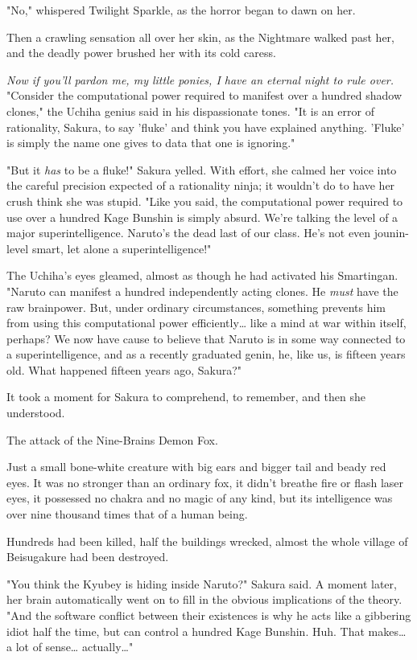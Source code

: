 "No," whispered Twilight Sparkle, as the horror began to dawn on her.

Then a crawling sensation all over her skin, as the Nightmare walked past her, 
and the deadly power brushed her with its cold caress.

\emph{Now if you'll pardon me, my little ponies, I have an eternal night to 
rule over.}
\sbreak
"Consider the computational power required to manifest over a hundred shadow 
clones," the Uchiha genius said in his dispassionate tones. "It is an error of 
rationality, Sakura, to say 'fluke' and think you have explained anything. 
'Fluke' is simply the name one gives to data that one is ignoring."

"But it \emph{has} to be a fluke!" Sakura yelled. With effort, she calmed her 
voice into the careful precision expected of a rationality ninja; it wouldn't 
do to have her crush think she was stupid. "Like you said, the computational 
power required to use over a hundred Kage Bunshin is simply absurd. We're 
talking the level of a major superintelligence. Naruto's the dead last of our 
class. He's not even jounin-level smart, let alone a superintelligence!"

The Uchiha's eyes gleamed, almost as though he had activated his Smartingan. 
"Naruto can manifest a hundred independently acting clones. He \emph{must} have 
the raw brainpower. But, under ordinary circumstances, something prevents him 
from using this computational power efficiently{\ldots} like a mind at war 
within itself, perhaps? We now have cause to believe that Naruto is in some way 
connected to a superintelligence, and as a recently graduated genin, he, like 
us, is fifteen years old. What happened fifteen years ago, Sakura?"

It took a moment for Sakura to comprehend, to remember, and then she understood.

The attack of the Nine-Brains Demon Fox.

Just a small bone-white creature with big ears and bigger tail and beady red 
eyes. It was no stronger than an ordinary fox, it didn't breathe fire or flash 
laser eyes, it possessed no chakra and no magic of any kind, but its 
intelligence was over nine thousand times that of a human being.

Hundreds had been killed, half the buildings wrecked, almost the whole village 
of Beisugakure had been destroyed.

"You think the Kyubey is hiding inside Naruto?" Sakura said. A moment later, 
her brain automatically went on to fill in the obvious implications of the 
theory. "And the software conflict between their existences is why he acts like 
a gibbering idiot half the time, but can control a hundred Kage Bunshin. Huh. 
That makes{\ldots} a lot of sense{\ldots} actually{\ldots}"

